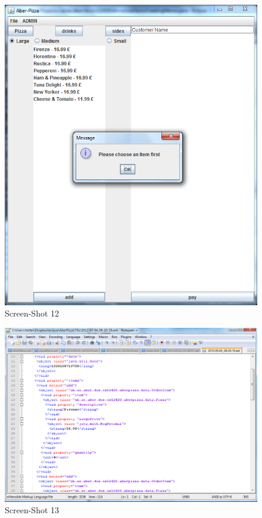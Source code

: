\documentclass[11pt,a4paper]{article}
\begin{document}
\begin{flushleft}
\begin{figure}[ht]
	\centering
 	\includegraphics[scale = 0.4]{../Sceenshots/Capture12.PNG} 
	\caption{Screen-Shot 12}
\end{figure}

\begin{figure}[ht]
	\centering
 	\includegraphics[scale=0.4]{../Sceenshots/xmlSave.PNG} 
	\caption{Screen-Shot 13}
\end{figure}


\end{flushleft}
\end{document}
